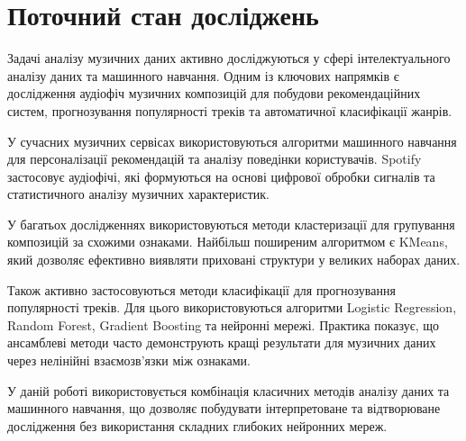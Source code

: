 \section{Поточний стан досліджень}

Задачі аналізу музичних даних активно досліджуються у сфері інтелектуального аналізу даних та машинного навчання. Одним із ключових напрямків є дослідження аудіофіч музичних композицій для побудови рекомендаційних систем, прогнозування популярності треків та автоматичної класифікації жанрів.

У сучасних музичних сервісах використовуються алгоритми машинного навчання для персоналізації рекомендацій та аналізу поведінки користувачів. Spotify застосовує аудіофічі, які формуються на основі цифрової обробки сигналів та статистичного аналізу музичних характеристик.

У багатьох дослідженнях використовуються методи кластеризації для групування композицій за схожими ознаками. Найбільш поширеним алгоритмом є KMeans, який дозволяє ефективно виявляти приховані структури у великих наборах даних.

Також активно застосовуються методи класифікації для прогнозування популярності треків. Для цього використовуються алгоритми Logistic Regression, Random Forest, Gradient Boosting та нейронні мережі. Практика показує, що ансамблеві методи часто демонструють кращі результати для музичних даних через нелінійні взаємозв'язки між ознаками.

У даній роботі використовується комбінація класичних методів аналізу даних та машинного навчання, що дозволяє побудувати інтерпретоване та відтворюване дослідження без використання складних глибоких нейронних мереж.
